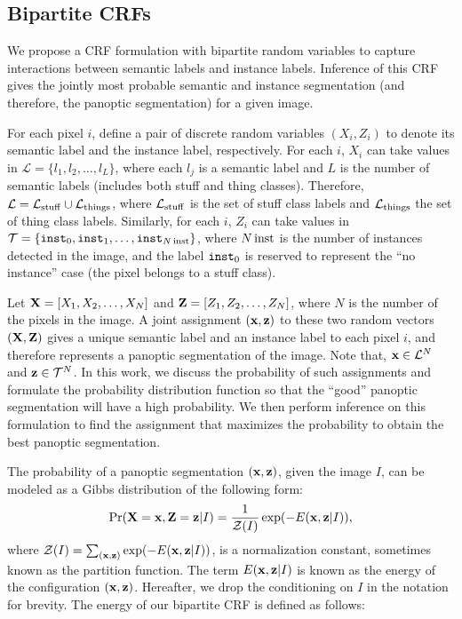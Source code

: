 \subsection{Bipartite CRFs}
\label{sec:body}
We propose a CRF formulation with bipartite random variables to capture interactions between semantic labels and instance labels. Inference of this CRF gives the jointly most probable semantic and instance segmentation (and therefore, the panoptic segmentation) for a given image. 

For each pixel $i$, define a pair of discrete random variables $(X_i, Z_i)$ to denote its semantic label and the instance label, respectively. For each $i$, $X_i$ can take values in $\mathcal{L} = \{l_1, l_2, \dots, l_L\}$, where each $l_j$ is a semantic label and $L$ is the number of semantic labels (includes both stuff and thing classes). Therefore, $\mathcal{L} = \mathcal{L}_{\operatorname{stuff}} \cup \mathcal{L}_{\operatorname{things}}$, where $\mathcal{L}_{\operatorname{stuff}}$ is the set of stuff class labels and $\mathcal{L}_{\operatorname{things}}$ the set of thing class labels. Similarly, for each $i$, $Z_i$ can take values in $\mathcal{T} = \{\texttt{inst}_0, \texttt{inst}_1, \dots, \texttt{inst}_{N\operatorname{inst}} \}$, where $N\operatorname{inst}$ is the number of instances detected in the image, and the label $\texttt{inst}_0$ is reserved to represent the ``no instance'' case (the pixel belongs to a stuff class).  


Let $\mathbf{X} = [X_1, X_2, \dots, X_N ]$ and $\mathbf{Z} = [Z_1, Z_2, \dots, Z_N
]$, where $N$ is the number of the pixels in the image. A joint assignment $(\mathbf{x}, \mathbf{z})$ to these two random vectors $(\mathbf{X}, \mathbf{Z})$ gives a unique semantic label and an instance label to each pixel $i$, and therefore represents a panoptic segmentation of the image. Note that, $\mathbf{x} \in \mathcal{L}^N$ and $\mathbf{z} \in \mathcal{T}^N$. In this work, we discuss the probability of such assignments and formulate the probability distribution function so that the ``good'' panoptic segmentation will have a high probability. We then perform inference on this formulation to find the assignment that maximizes the probability to obtain the best panoptic segmentation.

The probability of a panoptic segmentation $(\mathbf{x}, \mathbf{z})$, given the image $I$, can be modeled as a Gibbs distribution of the following form:
\begin{equation}
\label{eqn:prob}
\Pr(\mathbf{X} = \mathbf{x}, \mathbf{Z} = \mathbf{z}|I) = \frac{1}{\mathcal{Z}(I)}\exp(-E(\mathbf{x}, \mathbf{z}|I)),
\end{equation}
where $\mathcal{Z}(I) = \sum_{(\mathbf{x},\mathbf{z})} \exp(-E(\mathbf{x}, \mathbf{z}|I))$, is a normalization constant, sometimes known as the partition function. The term $E(\mathbf{x}, \mathbf{z}|I)$ is known as the energy of the configuration $(\mathbf{x}, \mathbf{z})$. Hereafter, we drop the conditioning on $I$ in the notation for brevity. The energy of our bipartite CRF is defined as follows:

